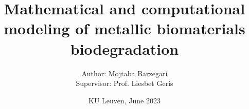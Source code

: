 \documentclass[12pt,a4paper]{report}
\title{Mathematical and computational modeling of metallic biomaterials biodegradation}
\author{Author: Mojtaba Barzegari\\Supervisor: Prof. Liesbet Geris}
\date{KU Leuven, June 2023}
\begin{document}
\maketitle



\tableofcontents

\graphicspath{{chapters/introduction/image/}}


\graphicspath{{chapters/objective/image/}}


\graphicspath{{chapters/core/image/}}


\graphicspath{{chapters/fluid/image/}}


\graphicspath{{chapters/kinetics/image/}}


\graphicspath{{chapters/tissue/image/}}


\graphicspath{{chapters/hpc/image/}}


\graphicspath{{chapters/biodeg/image/}}


\graphicspath{{chapters/bayesian/image/}}


\graphicspath{{chapters/cup/image/}}


\graphicspath{{chapters/infill/image/}}


\graphicspath{{chapters/mandible/image/}}


\graphicspath{{chapters/conclusion/image/}}




\end{document}
